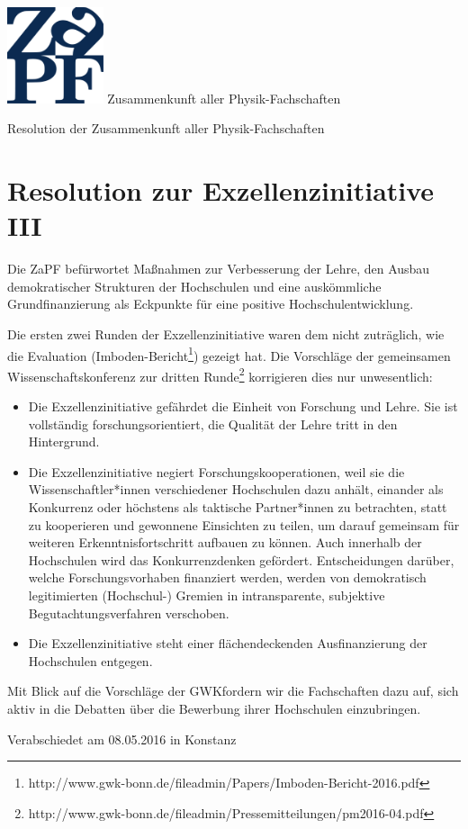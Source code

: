 \documentclass[DIV=calc]{scrartcl}
\begin{document}
\hspace{0.87\textwidth}
\begin{minipage}{120pt}
\vspace{-1.8cm}
\includegraphics[width=80pt]{logo.pdf}
\centering
\small Zusammenkunft aller Physik-Fachschaften
\end{minipage}
\begin{center}
\huge{Resolution der Zusammenkunft aller Physik-Fachschaften} \\
\normalsize
\end{center}

\vspace{1cm}
\section*{Resolution zur Exzellenzinitiative III}

Die ZaPF befürwortet Maßnahmen zur Verbesserung der Lehre, den Ausbau demokratischer Strukturen der Hochschulen und eine auskömmliche Grundfinanzierung als Eckpunkte für eine positive Hochschulentwicklung.

Die ersten zwei Runden der Exzellenzinitiative waren dem nicht zuträglich, wie die Evaluation (Imboden-Bericht\footnote{http://www.gwk-bonn.de/fileadmin/Papers/Imboden-Bericht-2016.pdf}) gezeigt hat. Die Vorschläge der gemeinsamen Wissenschaftskonferenz zur dritten Runde\footnote{http://www.gwk-bonn.de/fileadmin/Pressemitteilungen/pm2016-04.pdf} korrigieren dies nur unwesentlich:

\begin{itemize}
\item Die Exzellenzinitiative gefährdet die Einheit von Forschung und Lehre. Sie ist vollständig forschungsorientiert, die Qualität der Lehre tritt in den Hintergrund.
\item Die Exzellenzinitiative negiert Forschungskooperationen, weil sie die Wissenschaftler*innen verschiedener Hochschulen dazu anhält, einander als Konkurrenz oder höchstens als taktische Partner*innen zu betrachten, statt zu kooperieren und gewonnene Einsichten zu teilen, um darauf gemeinsam für weiteren Erkenntnisfortschritt aufbauen zu können. Auch innerhalb der Hochschulen wird das Konkurrenzdenken gefördert. Entscheidungen darüber, welche Forschungsvorhaben finanziert werden, werden von demokratisch legitimierten (Hochschul-) Gremien in intransparente, subjektive Begutachtungsverfahren verschoben.
\item Die Exzellenzinitiative steht einer flächendeckenden Ausfinanzierung der Hochschulen entgegen.
\end{itemize}

Mit Blick auf die Vorschläge der GWK\footnotemark[2] fordern wir die Fachschaften dazu auf, sich aktiv in die Debatten über die Bewerbung ihrer Hochschulen einzubringen.


\vfill
\begin{flushright}
Verabschiedet am 08.05.2016 in Konstanz
\end{flushright}
\end{document}

